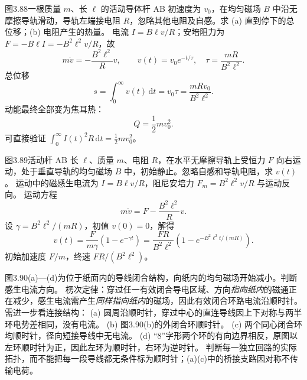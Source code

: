 图3.88一根质量 $m$、长 $\ell$ 的活动导体杆 AB 初速度为 $v_0$，在均匀磁场 $B$ 中沿无摩擦导轨滑动，导轨左端接电阻 $R$，忽略其他电阻及自感。求 (a) 直到停下的总位移；(b) 电阻产生的热量。
\exsolution
电流 $I=B\ell v/R$；安培阻力为
$F=-B\ell I=-B^2\ell^2v/R$，故
\[
m\dot v=-\frac{B^2\ell^2}{R}v,\qquad
v(t)=v_0e^{-t/\tau},\quad
\tau=\frac{mR}{B^2\ell^2}.
\]
总位移
\[
\boxed{s=\int_0^\infty v(t)\,\mathrm dt
=v_0\tau=\frac{mRv_0}{B^2\ell^2}}.
\]
动能最终全部变为焦耳热：
\[
\boxed{Q=\frac12mv_0^2}.
\]
\excheck 可直接验证
$\int_0^\infty I(t)^2R\,\mathrm dt
=\frac12mv_0^2$。

图3.89活动杆 AB 长 $\ell$、质量 $m$、电阻 $R$，在水平无摩擦导轨上受恒力 $F$ 向右运动，处于垂直导轨的均匀磁场 $B$ 中，初始静止。忽略自感和导轨电阻，求 $v(t)$。
\exsolution
运动中的磁感生电流为
$I=B\ell v/R$，阻尼安培力
$F_m=B^2\ell^2v/R$ 与运动反向。
运动方程
\[
m\dot v=F-\frac{B^2\ell^2}{R}v.
\]
设 $\gamma=B^2\ell^2/(mR)$，初值 $v(0)=0$，解得
\[
\boxed{v(t)=\frac{F}{m\gamma}
(1-e^{-\gamma t})
=\frac{FR}{B^2\ell^2}
\left(1-e^{-B^2\ell^2t/(mR)}\right)}.
\]
\excheck 初始加速度 $F/m$，终速 $FR/(B^2\ell^2)$。

图3.90(a)—(d)为位于纸面内的导线闭合结构，向纸内的均匀磁场开始减小。判断感生电流方向。
\exsolution
楞次定律：穿过任一有效闭合导电区域、方向\emph{指向纸内}的磁通正在减少，感生电流需产生\emph{同样指向纸内}的磁场，因此有效闭合环路电流沿顺时针。需进一步看连接结构：
(a) 圆周沿顺时针，穿过中心的直连导线因上下对称与两半环电势差相同，没有电流。
(b) 图3.90(b)的外闭合环顺时针。
(c) 两个同心闭合环均顺时针，径向短接导线中无电流。
(d) “8”字形两个环的有向边界相反，原图以左环顺时针为正，因此左环为顺时针，右环为逆时针。
\excheck 判断每一独立回路的实际拓扑，而不能把每一段导线都无条件标为顺时针；(a)(c)中的桥接支路因对称不传输电荷。
